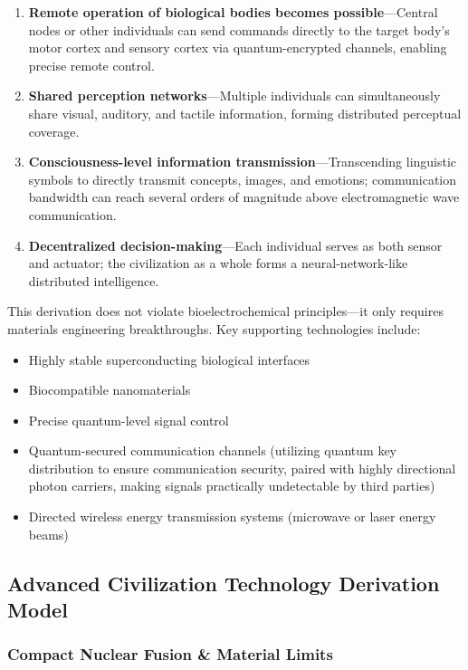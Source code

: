 \documentclass[aps,prd,twocolumn,superscriptaddress,nofootinbib]{revtex4-2}
\begin{document}
\begin{enumerate}
  \item \textbf{Remote operation of biological bodies becomes possible}---Central nodes or other individuals can send commands directly to the target body's motor cortex and sensory cortex via quantum-encrypted channels, enabling precise remote control.
  \item \textbf{Shared perception networks}---Multiple individuals can simultaneously share visual, auditory, and tactile information, forming distributed perceptual coverage.
  \item \textbf{Consciousness-level information transmission}---Transcending linguistic symbols to directly transmit concepts, images, and emotions; communication bandwidth can reach several orders of magnitude above electromagnetic wave communication.
  \item \textbf{Decentralized decision-making}---Each individual serves as both sensor and actuator; the civilization as a whole forms a neural-network-like distributed intelligence.
\end{enumerate}

This derivation does not violate bioelectrochemical principles---it only requires materials engineering breakthroughs. Key supporting technologies include:

\begin{itemize}
  \item Highly stable superconducting biological interfaces
  \item Biocompatible nanomaterials
  \item Precise quantum-level signal control
  \item Quantum-secured communication channels (utilizing quantum key distribution to ensure communication security, paired with highly directional photon carriers, making signals practically undetectable by third parties)
  \item Directed wireless energy transmission systems (microwave or laser energy beams)
\end{itemize}

\subsection{Advanced Civilization Technology Derivation Model}\label{sec:advanced-tech}

\subsubsection{Compact Nuclear Fusion \& Material Limits}\label{sec:compact-fusion}
\end{document}
